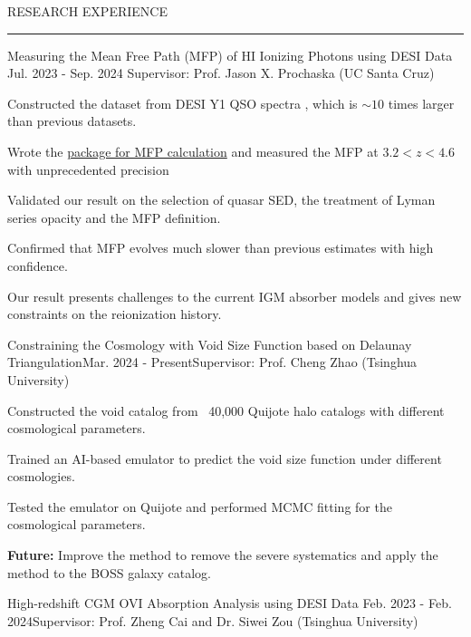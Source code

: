 \documentclass{resume} %
\renewenvironment{rSection}[1]{
\sectionskip
\textcolor{TsinghuaPurple}{\MakeUppercase{#1}}
\sectionlineskip
\hrule
\begin{list}{}{
\setlength{\leftmargin}{0em}
}
\item[]
}{
\end{list}
}
\begin{document}
\begin{rSection}{RESEARCH EXPERIENCE}

    \begin{rSubsection}{Measuring the Mean Free Path (MFP) of HI Ionizing Photons using DESI Data} {Jul. 2023 - Sep. 2024} {Supervisor: Prof. Jason X. Prochaska (UC Santa Cruz)}

    \item Constructed the dataset from DESI Y1 QSO spectra , which is $\sim10$ times larger than previous datasets.
    \item Wrote the \href{https://github.com/AnningGao/MeanFreePath}{package for MFP calculation} and measured the MFP at $3.2<z<4.6$ with unprecedented precision
    \item Validated our result on the selection of quasar SED, the treatment of Lyman series opacity and the MFP definition.
    \item Confirmed that MFP evolves much slower than previous estimates with high confidence.
    \item Our result presents challenges to the current IGM absorber models and gives new constraints on the reionization history.
        
    \end{rSubsection}

    \begin{rSubsection}{Constraining the Cosmology with Void Size Function based on Delaunay Triangulation}{Mar. 2024 - Present}{Supervisor: Prof. Cheng Zhao (Tsinghua University)}

    \item Constructed the void catalog from ~40,000 Quijote halo catalogs with different cosmological parameters.
    \item Trained an AI-based emulator to predict the void size function under different cosmologies.
    \item Tested the emulator on Quijote and performed MCMC fitting for the cosmological parameters.
    \item {\bf Future:} Improve the method to remove the severe systematics and apply the method to the BOSS galaxy catalog.

    \end{rSubsection}

    \begin{rSubsection}{High-redshift CGM OVI Absorption Analysis using DESI Data} {Feb. 2023 - Feb. 2024}{Supervisor: Prof. Zheng Cai and Dr. Siwei Zou (Tsinghua University)}
        

\end{rSubsection}
\end{rSection}
\end{document}
